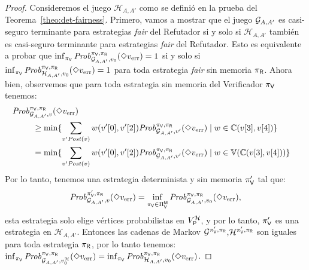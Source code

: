 $
$

\begin{proof} 
Consideremos el juego $\mathcal{H}_{A,A'}$ como se definió en la prueba del Teorema~\ref{theo:det-fairness}.  Primero, vamos a mostrar que el juego $\mathcal{G}_{A,A'}$ es casi-seguro terminante para estrategias \emph{fair} del Refutador si y solo si $\mathcal{H}_{A,A'}$ también es casi-seguro terminante para estrategias \emph{fair} del Refutador.  
Esto es equivalente a probar que $\inf_{\pi_{\mathsf{V}}} \mathit{Prob}^{\pi_{\mathsf{V}}, \pi_{\mathsf{R}}}_{\mathcal{G}_{A,A'}, v_0}(\Diamond v_{\text{err}})=1$ 
si y solo si $\inf_{\pi_{\mathsf{V}}} \mathit{Prob}^{\pi_{\mathsf{V}}, \pi_{\mathsf{R}}}_{\mathcal{H}_{A,A'}, v_0}(\Diamond v_{\text{err}})=1$ para toda estrategia \emph{fair} sin memoria  $\pi_{\mathsf{R}}$. Ahora bien, observemos que para toda estrategia sin memoria del Verificador $\pi_{\mathsf{V}}$ tenemos:
\begin{align*}
     \Prob{\strat{\Verifier}}{\strat{\Refuter}}_{\mathcal{G}_{A,A'}, v}(\Diamond \ErrorSt) \\
        &  \hspace{-5.5em} \geq \min\{ \sum_{v' \post(v)} w(\pr{0}{v'}, \pr{2}{v'})\Prob{\strat{\Verifier}}{\strat{\Refuter}}_{\mathcal{G}_{A,A'}, v'}(\Diamond \ErrorSt) \mid w \in \couplings{\pr{3}{v}}{\pr{4}{v}} \}\\
         & \hspace{-5.5em} = \min\{ \sum_{v' \post(v)} w(\pr{0}{v'}, \pr{2}{v'})\Prob{\strat{\Verifier}}{\strat{\Refuter}}_{\mathcal{G}_{A,A'}, v'}(\Diamond \ErrorSt) \mid w \in\vertices{\couplings{\pr{3}{v}}{\pr{4}{v}}} \}
\end{align*}
Por lo tanto, tenemos una estrategia determinista y sin memoria $\pi_{\mathsf{V}}'$ tal que:
\[
\mathit{Prob}^{\pi_{\mathsf{V}}', \pi_{\mathsf{R}}}_{\mathcal{G}_{A,A'}, v}(\Diamond v_{\text{err}}) = \inf_{\pi_{\mathsf{V}} \in \Pi_{\mathsf{V}}^{\mathsf{M}}} \mathit{Prob}^{\pi_{\mathsf{V}}, \pi_{\mathsf{R}}}_{\mathcal{G}_{A,A'}, v_0}(\Diamond v_{\text{err}}),
\]
esta estrategia solo elige vértices probabilistas en  $V^{\mathcal{H}}_{\mathsf{P}}$, y por lo tanto, $\pi_{\mathsf{V}}'$ es una estrategia 
en $\mathcal{H}_{A,A'}$. Entonces las cadenas de Markov  $\mathcal{G}^{\pi_{\mathsf{V}}',\pi_{\mathsf{R}}}$,$ \mathcal{H}^{\pi_{\mathsf{V}}',\pi_{\mathsf{R}}}$
son iguales para toda estrategia $\pi_{\mathsf{R}}$, por lo tanto tenemos: 
$\inf_{\pi_{\mathsf{V}}} \mathit{Prob}^{\pi_{\mathsf{V}}, \pi_{\mathsf{R}}}_{\mathcal{G}_{A,A'}, v^{\mathcal{H}}_0}(\Diamond v_{\text{err}})
= \inf_{\pi_{\mathsf{V}}} \mathit{Prob}^{\pi_{\mathsf{V}}, \pi_{\mathsf{R}}}_{\mathcal{H}_{A,A'}, v_0}(\Diamond v_{\text{err}})$.


\end{proof}
